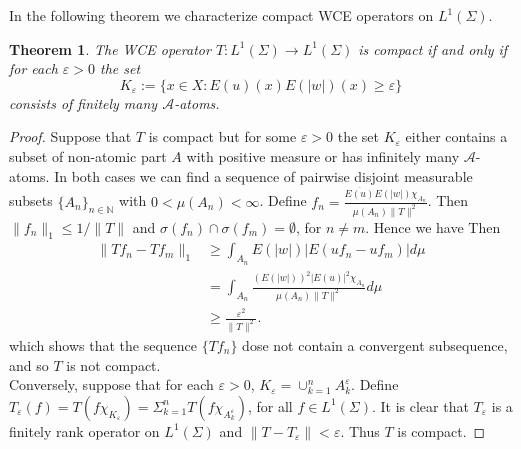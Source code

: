 \documentclass{amsart}
\newtheorem{thm}{Theorem}[section]
\theoremstyle{definition}\newtheorem{defn}[thm]{Definition}
\theoremstyle{remark}
\numberwithin{equation}{section}
\begin{document}
In the following theorem we characterize compact WCE operators on $L^1(\Sigma)$.
\begin{thm}
The WCE operator $T:L^{1}(\Sigma)\rightarrow L^{1}(\Sigma)$ is
compact if and only if for each $\varepsilon>0$ the set
$$K_\varepsilon:=\{x\in X:E(u)(x)E(|w|)(x)\geq\varepsilon\}$$
consists of finitely many $\mathcal{A}$-atoms.
\end{thm}
\begin{proof}
Suppose that $T$ is
compact but for some
$\varepsilon>0$ the set $K_\varepsilon$ either contains a
 subset of non-atomic part $A$ with positive measure or has infinitely many $\mathcal{A}$-atoms. In both cases we
 can find a sequence of pairwise disjoint measurable subsets
 $\{A_{n}\}_{n\in \mathbb{N}}$ with $0<\mu(A_{n})<\infty$.
 Define $f_{n}=\frac{\overline{E(u)}E(|w|)\chi_{A_{n}}}{\mu(A_{n})\|T\|^2}$. Then
 $\|f_{n}\|_{1}\leq1/\|T\|$ and $\sigma(f_n)\cap\sigma(f_m)=\emptyset$, for $n\neq
 m$. Hence we have
  Then
  \begin{align*}
  \|Tf_{n}-Tf_{m}\|_{1}&\geq\int_{A_{n}}E(|w|)|E(uf_{n}-uf_{m})|d\mu\\
 &=\int_{A_{n}}\frac{(E(|w|))^2|E(u)|^2\chi_{A_{n}}}{\mu(A_{n})\|T\|^2}d\mu\\
 &\geq\frac{\varepsilon^{2}}{\|T\|^2}.
 \end{align*}
which shows that the sequence $\{Tf_n\}$ dose not contain a
convergent subsequence, and so $T$ is not compact.\\

Conversely, suppose that for each $\varepsilon>0$,
$K_\varepsilon=\cup^{n}_ {k=1}A^{\varepsilon}_{k}$. Define
$T_{\varepsilon}(f)=T(f\chi_{K_\varepsilon})=\Sigma_{k=1}^nT(f\chi_{A^{\varepsilon}_{k}})$,
for all $f\in L^{1}(\Sigma)$. It is clear that $T_{\varepsilon}$ is
a finitely rank operator on $L^{1}(\Sigma)$ and
$\|T-T_{\varepsilon}\|<\varepsilon$. Thus $T$ is compact.
\end{proof}
\end{document}
